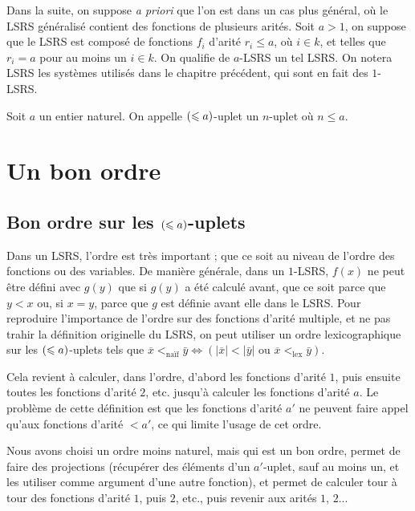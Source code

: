 		Dans la suite, on suppose \emph{a priori} que l'on est dans un cas plus général, où le LSRS généralisé contient des fonctions de plusieurs arités. Soit $a>1$, on suppose que le LSRS est composé de fonctions $f_i$ d'arité $r_i \leqslant a$, où $i \in k$, et telles que $r_i = a$ pour au moins un $i\in k$. On qualifie de $a$-LSRS un tel LSRS. On notera LSRS les systèmes utilisés dans le chapitre précédent, qui sont en fait des $1$-LSRS. 
		
		\begin{definition}
			Soit $a$ un entier naturel. On appelle $\left( \leqslant a \right)$-uplet un $n$-uplet où $n\leqslant a$. 
		\end{definition}

	
	
	\section{Un bon ordre} %
	\label{sec:ennuis_commencent}
	
		
		\subsection{Bon ordre sur les $\left( \leqslant a \right)$-uplets}
		\label{subsec:bon_ordre_uplets}
		
		Dans un LSRS, l'ordre est très important ; que ce soit au niveau de l'ordre des fonctions ou des variables. De manière générale, dans un $1$-LSRS, $f(x)$ ne peut être défini avec $g(y)$ que si $g(y)$ a été calculé avant, que ce soit parce que $y<x$ ou, si $x=y$, parce que $g$ est définie avant elle dans le LSRS. 
		Pour reproduire l'importance de l'ordre sur des fonctions d'arité multiple, et ne pas trahir la définition originelle du LSRS, on peut utiliser un ordre lexicographique sur les $\left( \leqslant a \right)$-uplets tels que $\overline{x} <_{\text{naïf}} \bar{y} \Leftrightarrow \left(\left|\overline{x}\right| < \left|\bar{y}\right| \text{ ou } \overline{x} <_{\text{lex}} \bar{y}\right)$.
			
		Cela revient à calculer, dans l'ordre, d'abord les fonctions d'arité $1$, puis ensuite toutes les fonctions d'arité $2$, etc. jusqu'à calculer les fonctions d'arité $a$. Le problème de cette définition est que les fonctions d'arité $a'$ ne peuvent faire appel qu'aux fonctions d'arité $<a'$, ce qui limite l'usage de cet ordre.
		
		Nous avons choisi un ordre moins naturel, mais qui est un bon ordre, permet de faire des projections (récupérer des éléments d'un $a'$-uplet, sauf au moins un, et les utiliser comme argument d'une autre fonction), et permet de calculer tour à tour des fonctions d'arité $1$, puis $2$, etc., puis revenir aux arités $1$, $2$...
		
